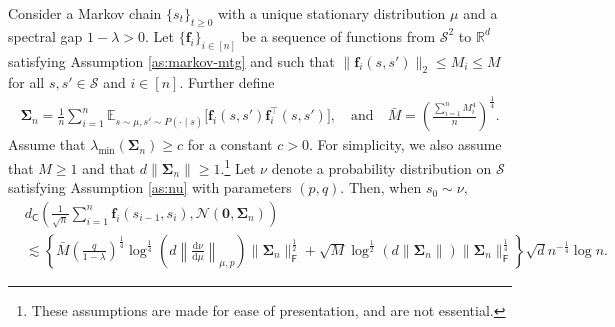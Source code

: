 \medskip
\begin{customcorollary}\label{thm:Berry-Esseen-mtg}
Consider a Markov chain $\{s_t\}_{t \geq 0}$ with a unique stationary distribution $\mu$ and a spectral gap $1-\lambda > 0$. Let $\{\bm{f}_i\}_{i \in [n]}$ be a sequence of functions from $\mathcal{S}^2$ to $\mathbb{R}^{d }$ satisfying Assumption \ref{as:markov-mtg} and such that $\|\bm{f}_i(s,s')\|_2 \leq M_i \leq M$ for all $s,s' \in \mathcal{S}$ and $i \in [n]$. Further define
\begin{align*}
\bm{\Sigma}_n = \frac{1}{n} \sum_{i=1}^n \mathbb{E}_{s\sim\mu,s' \sim P(\cdot \mid s)}\Big[\bm{f}_i(s,s')\bm{f}_i^\top(s,s')\Big], \quad \text{and} \quad \bar{M} = \left(\frac{\sum_{i=1}^n M_i^4}{n}\right)^{\frac{1}{4}}.
\end{align*} 
Assume that $\lambda_{\min}(\bm{\Sigma}_n)\geq c $ for a constant $c>0$. For simplicity, we also assume that $M \geq 1$ and that $d\|\bm{\Sigma}_n\| \geq 1$.\footnote{These assumptions are made for ease of presentation, and are not essential.} 
Let $\nu$ denote a probability distribution on $\mathcal{S}$ satisfying Assumption \ref{as:nu} with parameters $(p,q)$. 
Then, when $s_0 \sim \nu$,
\begin{align}\label{eq:Berry-Esseen-mtg}
&d_{\mathsf{C}}\left(\frac{1}{\sqrt{n}}\sum_{i=1}^n \bm{f}_i(s_{i-1}, s_i), \mathcal{N}(\bm{0},\bm{\Sigma}_n)\right) \nonumber \\ 
&\lesssim \left\{\bar{M}\left(\frac{q}{1-\lambda}\right)^{\frac{1}{4}}\log^{\frac{1}{4}}\left(d\left\|\frac{\mathrm{d}\nu}{\mathrm{d}\mu}\right\|_{\mu,p}\right)\|\bm{\Sigma}_n\|_{\mathsf{F}}^{\frac{1}{2}}+ \sqrt{M} \log^{\frac{1}{2}} (d\|\bm{\Sigma}_n\|)\|\bm{\Sigma}_n\|_{\mathsf{F}}^{\frac{1}{4}}\right\}\sqrt{d} n^{-\frac{1}{4}}\log n.
\end{align}
\end{customcorollary}
\medskip

